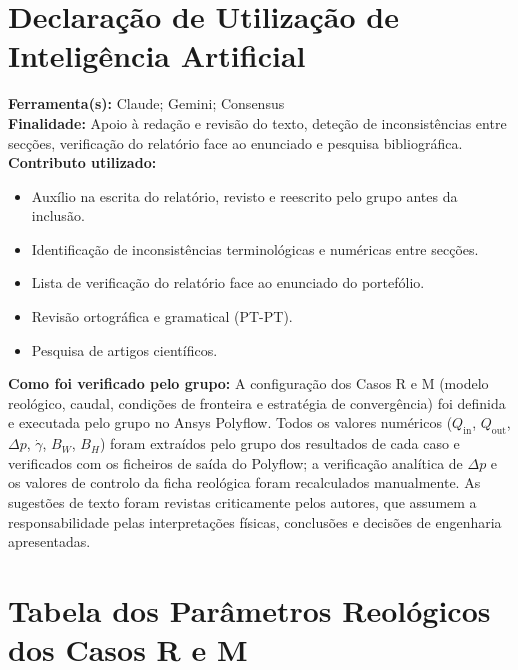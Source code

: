 \documentclass[10pt,a4paper]{article}
\begin{document}
\section*{Declaração de Utilização de Inteligência Artificial}
{}
\noindent\textbf{Ferramenta(s):} Claude; Gemini; Consensus \\[1.5em]
\textbf{Finalidade:} Apoio à redação e revisão do texto, deteção de inconsistências entre secções, verificação do relatório face ao enunciado e pesquisa bibliográfica. \\[1.5em]
\noindent\textbf{Contributo utilizado:}
\begin{itemize}
    \item Auxílio na escrita do relatório, revisto e reescrito pelo grupo antes da inclusão.
    \item Identificação de inconsistências terminológicas e numéricas entre secções.
    \item Lista de verificação do relatório face ao enunciado do portefólio.
    \item Revisão ortográfica e gramatical (PT-PT).
    \item Pesquisa de artigos científicos.
\end{itemize}

\noindent\textbf{Como foi verificado pelo grupo:} A configuração dos Casos R e M (modelo reológico, caudal, condições de fronteira e estratégia de convergência) foi definida e executada pelo grupo no Ansys Polyflow. Todos os valores numéricos ($Q_{\mathrm{in}}$, $Q_{\mathrm{out}}$, $\Delta p$, $\dot{\gamma}$, $B_W$, $B_H$) foram extraídos pelo grupo dos resultados de cada caso e verificados com os ficheiros de saída do Polyflow; a verificação analítica de $\Delta p$ e os valores de controlo da ficha reológica foram recalculados manualmente. As sugestões de texto foram revistas criticamente pelos autores, que assumem a responsabilidade pelas interpretações físicas, conclusões e decisões de engenharia apresentadas.

\newpage

{}



\newpage %

\appendix


\section{Tabela dos Parâmetros Reológicos dos Casos R e M}
\label{app:reologia}
\end{document}
